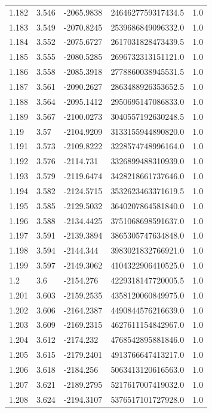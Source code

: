 \begin{tabular}{lllll}
1.182 & 3.546 & -2065.9838 & 2464627759317434.5 & 1.0 \\
1.183 & 3.549 & -2070.8245 & 2539686849096332.0 & 1.0 \\
1.184 & 3.552 & -2075.6727 & 2617031828473439.5 & 1.0 \\
1.185 & 3.555 & -2080.5285 & 2696732313151121.0 & 1.0 \\
1.186 & 3.558 & -2085.3918 & 2778860038945531.5 & 1.0 \\
1.187 & 3.561 & -2090.2627 & 2863488926353652.5 & 1.0 \\
1.188 & 3.564 & -2095.1412 & 2950695147086833.0 & 1.0 \\
1.189 & 3.567 & -2100.0273 & 3040557192630248.5 & 1.0 \\
1.19 & 3.57 & -2104.9209 & 3133155944890820.0 & 1.0 \\
1.191 & 3.573 & -2109.8222 & 3228574748996164.0 & 1.0 \\
1.192 & 3.576 & -2114.731 & 3326899488310939.0 & 1.0 \\
1.193 & 3.579 & -2119.6474 & 3428218661737646.0 & 1.0 \\
1.194 & 3.582 & -2124.5715 & 3532623463371619.5 & 1.0 \\
1.195 & 3.585 & -2129.5032 & 3640207864581840.0 & 1.0 \\
1.196 & 3.588 & -2134.4425 & 3751068698591637.0 & 1.0 \\
1.197 & 3.591 & -2139.3894 & 3865305747634848.0 & 1.0 \\
1.198 & 3.594 & -2144.344 & 3983021832766921.0 & 1.0 \\
1.199 & 3.597 & -2149.3062 & 4104322906410525.0 & 1.0 \\
1.2 & 3.6 & -2154.276 & 4229318147720005.5 & 1.0 \\
1.201 & 3.603 & -2159.2535 & 4358120060849975.0 & 1.0 \\
1.202 & 3.606 & -2164.2387 & 4490844576216639.0 & 1.0 \\
1.203 & 3.609 & -2169.2315 & 4627611154842967.0 & 1.0 \\
1.204 & 3.612 & -2174.232 & 4768542895881846.0 & 1.0 \\
1.205 & 3.615 & -2179.2401 & 4913766647413217.0 & 1.0 \\
1.206 & 3.618 & -2184.256 & 5063413120616563.0 & 1.0 \\
1.207 & 3.621 & -2189.2795 & 5217617007419032.0 & 1.0 \\
1.208 & 3.624 & -2194.3107 & 5376517101727928.0 & 1.0 \\

\end{tabular}

